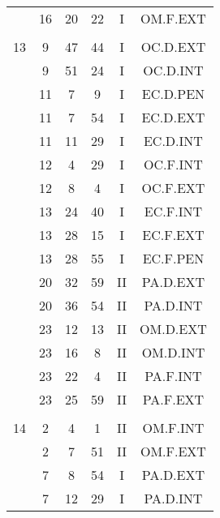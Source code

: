\documentclass[12pt, a4paper]{article}
\begin{document}
\begin{multicols}{3}
{\begin{tabular}{c c c c c c}
	 	 	 	 & 16 & 20 & 22 & I & OM.F.EXT\\%
	 	 	 	 & & & & & \\%
	 	 	 	13 & 9 & 47 & 44 & I & OC.D.EXT\\%
	 	 	 	 & 9 & 51 & 24 & I & OC.D.INT\\%
	 	 	 	 & 11 & 7 & 9 & I & EC.D.PEN\\%
	 	 	 	 & 11 & 7 & 54 & I & EC.D.EXT\\%
	 	 	 	 & 11 & 11 & 29 & I & EC.D.INT\\%
	 	 	 	 & 12 & 4 & 29 & I & OC.F.INT\\%
	 	 	 	 & 12 & 8 & 4 & I & OC.F.EXT\\%
	 	 	 	 & 13 & 24 & 40 & I & EC.F.INT\\%
	 	 	 	 & 13 & 28 & 15 & I & EC.F.EXT\\%
	 	 	 	 & 13 & 28 & 55 & I & EC.F.PEN\\%
	 	 	 	 & 20 & 32 & 59 & II & PA.D.EXT\\%
	 	 	 	 & 20 & 36 & 54 & II & PA.D.INT\\%
	 	 	 	 & 23 & 12 & 13 & II & OM.D.EXT\\%
	 	 	 	 & 23 & 16 & 8 & II & OM.D.INT\\%
	 	 	 	 & 23 & 22 & 4 & II & PA.F.INT\\%
	 	 	 	 & 23 & 25 & 59 & II & PA.F.EXT\\%
	 	 	 	 & & & & & \\%
	 	 	 	14 & 2 & 4 & 1 & II & OM.F.INT\\%
	 	 	 	 & 2 & 7 & 51 & II & OM.F.EXT\\%
	 	 	 	 & 7 & 8 & 54 & I & PA.D.EXT\\%
	 	 	 	 & 7 & 12 & 29 & I & PA.D.INT\\%

\end{tabular}}
\end{multicols}
\end{document}
